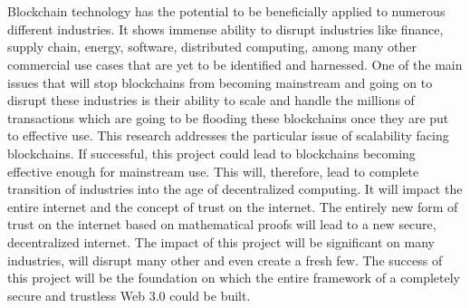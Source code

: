 \documentclass[a4paper,twoside,phd]{BYUPhys}
\begin{document}
\\
\\
Blockchain technology has the potential to be beneficially applied to numerous different industries. It shows immense ability to disrupt industries like finance, supply chain, energy, software, distributed computing, among many other commercial use cases that are yet to be identified and harnessed. One of the main issues that will stop blockchains from becoming mainstream and going on to disrupt these industries is their ability to scale and handle the millions of transactions which are going to be flooding these blockchains once they are put to effective use. This research addresses the particular issue of scalability facing blockchains. If successful, this project could lead to blockchains becoming effective enough for mainstream use. This will, therefore, lead to complete transition of industries into the age of decentralized computing. It will impact the entire internet and the concept of trust on the internet. The entirely new form of trust on the internet based on mathematical proofs will lead to a new secure, decentralized internet. The impact of this project will be significant on many industries, will disrupt many other and even create a fresh few. The success of this project will be the foundation on which the entire framework of a completely secure and trustless Web 3.0 could be built.
\end{document}
